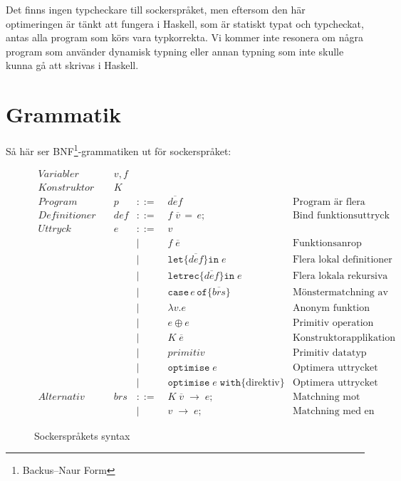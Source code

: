 \documentclass[Rapport]{subfiles}
\begin{document}
Det finns ingen typcheckare till sockerspråket, men eftersom den här optimeringen
är tänkt att fungera i Haskell, som är statiskt typat och typcheckat, antas
alla program som körs vara typkorrekta. Vi kommer inte resonera om några program
som använder dynamisk typning eller annan typning som inte skulle kunna gå
att skrivas i Haskell.

\section{Grammatik}

Så här ser BNF\footnote{Backus–Naur Form}-grammatiken ut för sockerspråket:

\begin{figure}[H]
\begin{equation*}
\begin{aligned}
Variabler \quad & v,f \\
Konstruktor \quad & K \\
Program \quad& p &::=&\; \overline{def} 
        & \text{Program är flera definitioner}\\ 
Definitioner  \quad & def & ::=&\; f \; \overline{v} \, \mathtt{=} \, e \mathtt{;} 
        & \text {Bind funktionsuttryck}\\
Uttryck \quad & e &::=&\;  v \\
       &&|&\; f \; \overline{e}  
            & \text{Funktionsanrop} \\ 
       &&|&\; \mathtt{let \{} \overline{def} \mathtt{\} in }\; e 
            & \text{Flera lokal definitioner}\\
       &&|&\; \mathtt{letrec \{} \overline{def} \mathtt{\} in} \; e 
            & \text{Flera lokala rekursiva definitioner} \\
       &&|&\; \mathtt{case} \, e \, \mathtt{of \{} \overline{brs} \mathtt{\}} 
            & \text{Mönstermatchning av uttryck} \\
       &&|&\; \mathtt{\lambda } v \mathtt{.} e
            & \text{Anonym funktion} \\
       &&|&\; e \oplus e 
            & \text{Primitiv operation}\\ 
       &&|&\; K \; \overline{e} 
            & \text{Konstruktorapplikation} \\
       &&|&\; primitiv 
            & \text{Primitiv datatyp} \\
       &&|&\; \mathtt{optimise} \; e 
            & \text{Optimera uttrycket} \\
       &&|&\; \mathtt{optimise } \; e \; \mathtt{ with \{} \text{direktiv} \} 
            & \text{Optimera uttrycket} \\
Alternativ \quad & brs &::=&\; K \; \overline{v} \; \mathtt{\rightarrow} \; e \mathtt{;} 
            & \text{Matchning mot konstruktor} \\
         &&|&\; v \; \mathtt{\rightarrow} \; e \mathtt{;}
            & \text{Matchning med en variabel}
\end{aligned}
\end{equation*}
\caption{Sockerspråkets syntax}
\end{figure}
\end{document}
